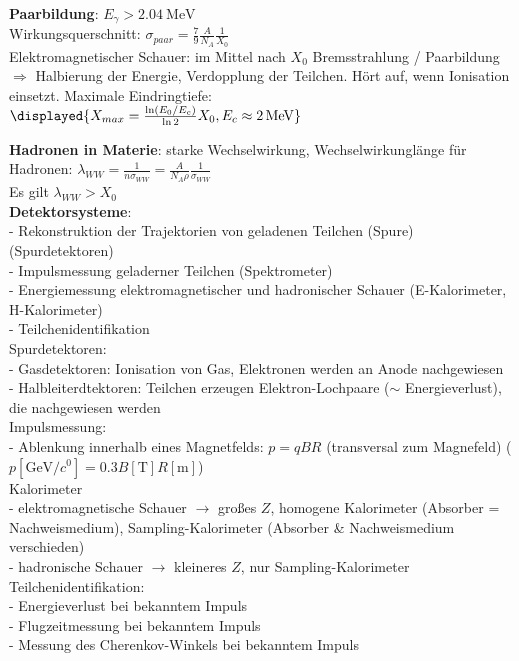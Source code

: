 \documentclass[9pt, landscape,a4paper]{extarticle}
\begin{document}
\begin{multicols*}{3}
\textbf{Paarbildung}: $E_γ > \SI{2.04}{\mega\electronvolt}$ \\
Wirkungsquerschnitt: $σ_{paar} = \frac{7}{9} \frac{A}{N_A} \frac{1}{X_0}$ \\

Elektromagnetischer Schauer: im Mittel nach $X_0$ Bremsstrahlung / Paarbildung $⇒$ Halbierung der Energie, Verdopplung der Teilchen. Hört auf, wenn Ionisation einsetzt.
Maximale Eindringtiefe: \\
$\displayed{X_{max} = \frac{\ln(E_0 / E_c)}{\ln 2} X_0, E_c \approx \SI{2}{\mega\electronvolt}}$

\textbf{Hadronen in Materie}: starke Wechselwirkung, Wechselwirkunglänge für Hadronen: $λ_{WW} = \frac{1}{n σ_{WW}} = \frac{A}{N_A ρ} \frac{1}{σ_{WW}}$ \\
Es gilt $λ_{WW} > X_0$ \\

\textbf{Detektorsysteme}: \\
- Rekonstruktion der Trajektorien von geladenen Teilchen (Spure) (Spurdetektoren) \\
- Impulsmessung geladerner Teilchen (Spektrometer) \\
- Energiemessung elektromagnetischer und hadronischer Schauer (E-Kalorimeter, H-Kalorimeter) \\
- Teilchenidentifikation \\

Spurdetektoren: \\
- Gasdetektoren: Ionisation von Gas, Elektronen werden an Anode nachgewiesen \\
- Halbleiterdtektoren: Teilchen erzeugen Elektron-Lochpaare ($\sim$ Energieverlust), die nachgewiesen werden \\

Impulsmessung: \\
- Ablenkung innerhalb eines Magnetfelds: $p = q B R$ (transversal zum Magnefeld) ($p[\si{\giga\electronvolt\per\clight}] = 0.3 B [\si{\tesla}] R [\si{\meter}]$) \\

Kalorimeter \\
- elektromagnetische Schauer $\to$ großes $Z$, homogene Kalorimeter (Absorber = Nachweismedium), Sampling-Kalorimeter (Absorber \& Nachweismedium verschieden) \\
- hadronische Schauer $\to$ kleineres $Z$, nur Sampling-Kalorimeter \\

Teilchenidentifikation: \\
- Energieverlust bei bekanntem Impuls \\
- Flugzeitmessung bei bekanntem Impuls \\
- Messung des Cherenkov-Winkels bei bekanntem Impuls \\


\end{multicols*}
\end{document}
